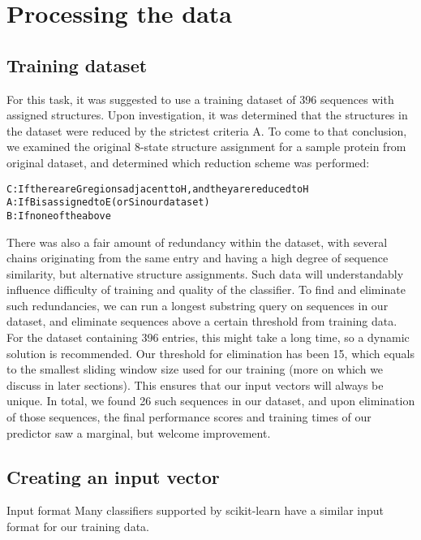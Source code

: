 \documentclass[12pt]{article}
\begin{document}
\section{Processing the data}


\subsection{Training dataset}

For this task, it was suggested to use a training dataset of 396 sequences with assigned structures. Upon investigation, it was determined that the structures in the dataset were reduced by the strictest criteria A. 
To come to that conclusion, we examined the original 8-state structure assignment for a sample protein from original dataset, and determined which reduction scheme was performed:
\begin{alltt} 

	  C: If there are G regions adjacent to H, and they are reduced to H
	  A: If B is assigned to E(or S in our dataset)
	  B: If none of the above                                           
	   
\end{alltt}	
There was also a fair amount of redundancy within the dataset, with several chains originating from the same entry and having a high degree of sequence similarity, but alternative structure assignments. Such data will understandably influence difficulty of training and quality of the classifier. To find and eliminate such redundancies, we can run a longest substring query on sequences in our dataset, and eliminate sequences above a certain threshold from training data. 
For the dataset containing 396 entries, this might take a long time, so a dynamic solution is recommended. Our threshold for elimination has been 15, which equals to the smallest sliding window size used for our training (more on which we discuss in later sections). This ensures that our input vectors will always be unique.
In total, we found 26 such sequences in our dataset, and upon elimination of those sequences, the final performance scores and training times of our predictor saw a marginal, but welcome improvement. 


\subsection{Creating an input vector}


Input format
Many classifiers supported by scikit-learn have a similar input format for our training data.\\
\end{document}
